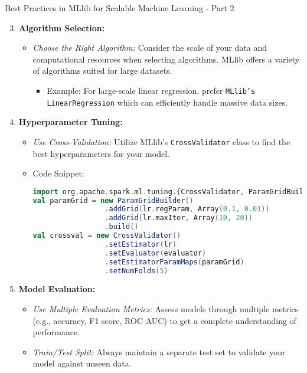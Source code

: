 \documentclass[aspectratio=169]{beamer}
\begin{document}
\begin{frame}[fragile]{Best Practices in MLlib for Scalable Machine Learning - Part 2}
    \begin{enumerate}
        \setcounter{enumi}{2} %
        \item \textbf{Algorithm Selection:}
            \begin{itemize}
                \item \textit{Choose the Right Algorithm:} Consider the scale of your data and computational resources when selecting algorithms. MLlib offers a variety of algorithms suited for large datasets.
                    \begin{itemize}
                        \item Example: For large-scale linear regression, prefer \texttt{MLlib’s LinearRegression} which can efficiently handle massive data sizes.
                    \end{itemize}
            \end{itemize}
        
        \item \textbf{Hyperparameter Tuning:}
            \begin{itemize}
                \item \textit{Use Cross-Validation:} Utilize MLlib’s \texttt{CrossValidator} class to find the best hyperparameters for your model.
                \item Code Snippet:
                    \begin{lstlisting}[language=scala]
import org.apache.spark.ml.tuning.{CrossValidator, ParamGridBuilder}
val paramGrid = new ParamGridBuilder()
                 .addGrid(lr.regParam, Array(0.1, 0.01))
                 .addGrid(lr.maxIter, Array(10, 20))
                 .build()
val crossval = new CrossValidator()
                 .setEstimator(lr)
                 .setEvaluator(evaluator)
                 .setEstimatorParamMaps(paramGrid)
                 .setNumFolds(5)
                    \end{lstlisting}
            \end{itemize}
        
        \item \textbf{Model Evaluation:}
            \begin{itemize}
                \item \textit{Use Multiple Evaluation Metrics:} Assess models through multiple metrics (e.g., accuracy, F1 score, ROC AUC) to get a complete understanding of performance.
                \item \textit{Train/Test Split:} Always maintain a separate test set to validate your model against unseen data.
            \end{itemize}
    \end{enumerate}
\end{frame}
\end{document}
